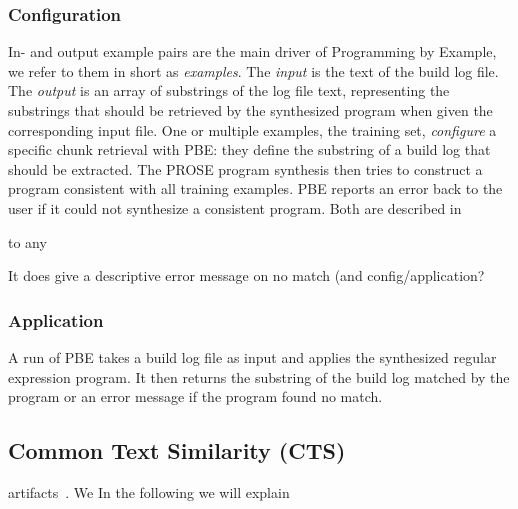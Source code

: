 \subsubsection{Configuration}
In- and output example pairs are the main driver of Programming by
Example, we refer to them in short as \emph{examples}.
The
\emph{input} is the text of the build log file.
The \emph{output} is
an array of substrings of the log file text, representing the
substrings that should be retrieved by the synthesized program when
given the corresponding input file.
One or multiple examples, the
training set, \emph{configure} a specific chunk retrieval with PBE:
they define the substring of a build log that should be extracted.
The
PROSE program synthesis then tries to construct a program consistent
with all training examples.
PBE reports an error back to the user if it could not synthesize a
consistent program.
Both are described in


to any

It does give a descriptive error message on no match (and
config/application?
\subsubsection{Application}
A run of PBE takes a build log file as input and applies the
synthesized regular expression program.
It then returns the substring
of the build log matched by the program or an error message if the
program found no match.


\subsection{Common Text Similarity (CTS)}
\label{sec:expl-ts}
%
artifacts~\cite{runeson2007detection,marcus2005recovery,antoniol2002recovering,mccarey2006recommending}.
We
In the following we will explain

